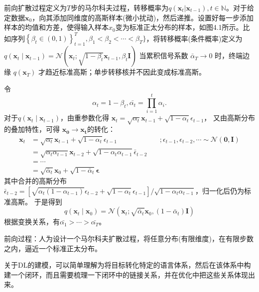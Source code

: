 前向扩散过程定义为$T$步的马尔科夫过程，转移概率为$q(\mathbf{x}_t|\mathbf{x}_{t-1}), t \in \mathbb{N}$。对于给定数据$\mathbf{x}_0$，向其添加同维度的高斯样本(微小扰动)，然后递推。设置好每一步添加样本的均值和方差，使得输入样本$x_0$变为标准正太分布的样本，如图4.1所示。比如序列$\left\{\beta_t \in(0,1)\right\}_{t=1}^T, \beta_1 < \beta_2 < \cdots < \beta_T\}$，将转移概率(条件概率)定义为$q\left(\mathbf{x}_t \mid \mathbf{x}_{t-1}\right)=\mathcal{N}\left(\mathbf{x}_t ; \sqrt{1-\beta_t} \mathbf{x}_{t-1}, \beta_t \mathbf{I}\right)$ 当累积信号系数 $\bar\alpha_T\to0$ 时，终端边缘 $q(\mathbf x_T)$ 才趋近标准高斯；单步转移核并不因此变成标准高斯。

令
\begin{equation}
\alpha_t = 1 - \beta_t, \bar{\alpha_{t}} = \prod_{i=1}^{t}\alpha_i.
\end{equation}
对于$q\left(\mathbf{x}_t \mid \mathbf{x}_{t-1}\right)$，由重参数化得
$\mathbf{x}_t =\sqrt{\alpha_t} \mathbf{x}_{t-1}+\sqrt{1-\alpha_t} \epsilon_{t-1}$，
又由高斯分布的叠加特性，可得
$\mathbf{x_0} \rightarrow \mathbf{x_t}$的转化：
\begin{equation}
\begin{array}{rlr}
\mathbf{x}_t & =\sqrt{\alpha_t} \mathbf{x}_{t-1}+\sqrt{1-\alpha_t} \epsilon_{t-1} & \quad ;  \epsilon_{t-1}, \epsilon_{t-2}, \cdots \sim \mathcal{N}(\mathbf{0}, \mathbf{I}) \\
& =\sqrt{\alpha_t \alpha_{t-1}} \mathbf{x}_{t-2}+\sqrt{1-\alpha_t \alpha_{t-1}} \bar{\epsilon}_{t-2}  \\
& =\cdots & \\
& =\sqrt{\bar{\alpha}_t} \mathbf{x}_0+\sqrt{1-\bar{\alpha}_t} \boldsymbol{\epsilon}
\end{array}
\end{equation}
其中合并的高斯分布$\bar{\epsilon}_{t-2} = [\sqrt{\alpha_t(1-\alpha_{t-1})}\epsilon_{t-2}+\sqrt{1-\alpha_t}\epsilon_{t-1}]/\sqrt{1-\alpha_t\alpha_{t-1}}$，归一化后仍为标准高斯。
于是得到
\begin{equation}
q\left(\mathbf{x}_t \mid \mathbf{x}_0\right)=\mathcal{N}\left(\mathbf{x}_t ; \sqrt{\bar{\alpha}_t} \mathbf{x}_0,\left(1-\bar{\alpha}_t\right) \mathbf{I}\right)
\end{equation}
根据变换关系，有$\bar{\alpha_1} > \cdots > \bar{\alpha_T}$。

前向过程：人为设计一个马尔科夫扩散过程，将任意分布(有限维度)，在有限步数之内，逼近一个标准正太分布。

关于DL的建模，可以简单理解为将目标转化特定的语言体系，然后在该体系中构建一个闭环，而且需要梳理一下闭环中的链接关系，并在优化中把这些关系体现出来。

